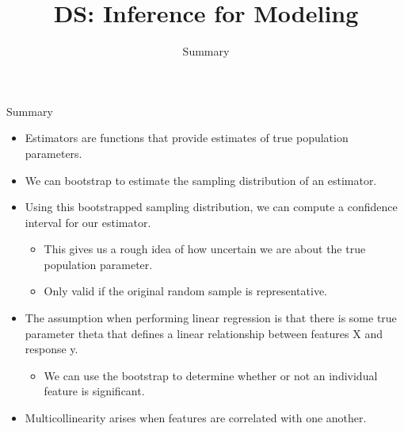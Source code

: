 \documentclass[aspectratio=169]{../latex_main/tntbeamer}  %
\title[Introduction]{DS: Inference for Modeling}
\subtitle{Summary}
\begin{document}
	
	\maketitle
	\begin{frame}{Summary}
	    \begin{itemize}
	        \item Estimators are functions that provide estimates of true population parameters.
	        \item We can bootstrap to estimate the sampling distribution of an estimator.
	        \item Using this bootstrapped sampling distribution, we can compute a confidence interval for our estimator.
	        \begin{itemize}
	            \item This gives us a rough idea of how uncertain we are about the true population parameter.
	            \item Only valid if the original random sample is representative.
	        \end{itemize}
	        \item The assumption when performing linear regression is that there is some true parameter theta that defines a linear relationship between features X and response y.
	        \begin{itemize}
	            \item We can use the bootstrap to determine whether or not an individual feature is significant.
	        \end{itemize}
	        \item Multicollinearity arises when features are correlated with one another.
	    \end{itemize}
	\end{frame}
	
	
	
\end{document}
